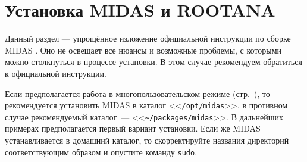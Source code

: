 \documentclass[12pt, a4paper, oneside, onecolumn]{book}
\newcommand{\MIDAS}{\mbox{MIDAS}}
\newcommand{\ROOTANA}{\mbox{ROOTANA}}
\newcommand{\APP}[1]{\mbox{\tt #1}}
\newcommand{\DIRECTORY}[1]{<<{\tt #1}>>}
\begin{document}
\section{Установка \MIDAS{} и \ROOTANA{}}

Данный раздел --- упрощённое изложение официальной инструкции по сборке \MIDAS{} \cite{MidasWikiInstall}. Оно не освещает все нюансы и возможные проблемы, с которыми можно столкнуться в процессе установки. В этом случае рекомендуем обратиться к официальной инструкции.

Если предполагается работа в многопользовательском режиме (стр.~\pageref{sec_multiuser}), то рекомендуется установить \MIDAS{} в каталог \DIRECTORY{/opt/midas}, в противном случае рекомендуемый каталог~--- \DIRECTORY{\~{}/packages/midas}. В дальнейших примерах предполагается первый вариант установки. Если же \MIDAS{} устанавливается в домашний каталог, то скорректируйте названия директорий соответствующим образом и  опустите команду \APP{sudo}.
\end{document}
